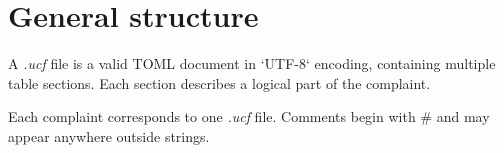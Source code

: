 
\section{General structure}

A \textit{.ucf} file is a valid TOML document in `UTF-8` encoding, containing
multiple table sections. Each section describes a logical part of the
complaint.

Each complaint corresponds to one \textit{.ucf} file. Comments begin with \#
and may appear anywhere outside strings.
